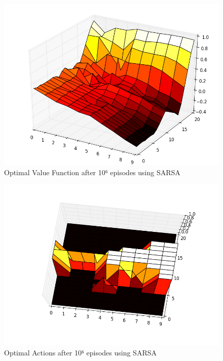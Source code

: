 \documentclass[12pt,a4paper]{article}
\begin{document}
\begin{figure}[!ht]
   \caption{\label{E21_S_V} Optimal Value Function after 10⁶ episodes using SARSA}
   \includegraphics[scale=0.4]{Easy21_Results/Sarsa_value_1e6.png}
\end{figure}

\begin{figure}[!ht]
   \caption{\label{E21_S_D} Optimal Actions after 10⁶ episodes using SARSA}
   \includegraphics[scale=0.4]{Easy21_Results/Sarsa_decision_1e6.png}
\end{figure}
\end{document}
